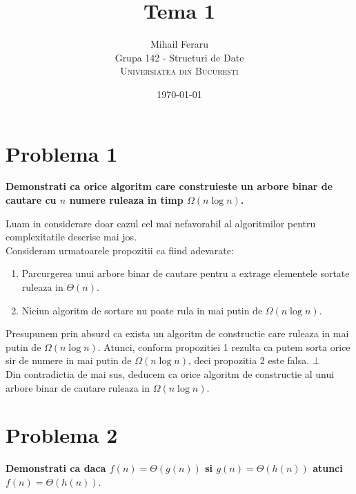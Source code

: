 \documentclass[12pt]{article}
\title{Tema 1}
\author{Mihail Feraru\\
Grupa 142 - Structuri de Date\\
\textsc{Universiatea din Bucuresti}
}
\date{\today} %
\begin{document}
\setlength{\droptitle}{-5em}    
\maketitle


\section*{Problema 1}
{\bfseries Demonstrati ca orice algoritm care construieste un arbore binar de  cautare cu $n$ numere  ruleaza in timp $\Omega(n \log{n})$.}

Luam in considerare doar cazul cel mai nefavorabil al algoritmilor pentru complexitatile descrise mai jos. \\
Consideram urmatoarele propozitii ca fiind adevarate:
\begin{enumerate}
    \item Parcurgerea unui arbore binar de cautare pentru a extrage elementele sortate ruleaza in $\Theta(n)$.
    \item Niciun algoritm de sortare nu poate rula in mai putin de $\Omega(n \log{n})$.
\end{enumerate}
Presupunem prin absurd ca exista un algoritm de constructie care ruleaza in mai putin de $\Omega(n \log{n})$. Atunci, conform propozitiei 1 rezulta ca putem sorta orice sir de numere in mai putin de  $\Omega(n \log{n})$, deci propozitia 2 este falsa. $\bot$ \\
Din contradictia de mai sus, deducem ca orice algoritm de constructie al unui arbore binar de cautare ruleaza in $\Omega({n \log{n}})$.

\section*{Problema 2}
{\bfseries Demonstrati ca daca $f(n) = \Theta(g(n))$ si $g(n) = \Theta(h(n))$ atunci $f(n) = \Theta(h(n))$}.
\end{document}
